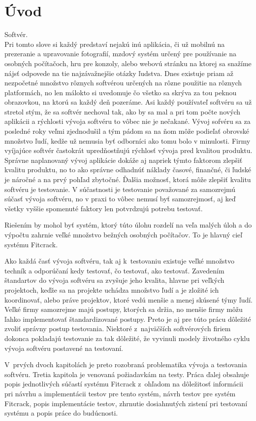 \chapter{Úvod}
Softvér. \\
Pri tomto slove si každý predstaví nejakú inú aplikácia, či už mobilnú na prezeranie a upravovanie fotografií, mzdový systém určený pre používanie na osobných počítačoch, hru pre konzoly, alebo webovú stránku na ktorej sa snažíme nájsť odpovede na tie najzávažnejšie otázky ľudstva.
Dnes existuje priam až nezpočetné množstvo rôznych softvérou určených na rôzne použitie na rôznych platformách, no len málokto si uvedomuje čo všetko sa skrýva za tou peknou obrazovkou, na ktorú sa každý deň pozeráme.
Asi každý používateľ softvéru sa už stretol stým, že sa softvér nechoval tak, ako by sa mal a pri tom počte nových aplikácii a rýchlosti vývoja softvéru to vôbec nie je nečakané. 
Vývoj sofvéru sa za posledné roky veľmi zjednodušil a tým pádom sa na ňom môže podieľať obrovské množstvo ľudí, kedže už nemusia byť odborníci ako tomu bolo v minulosti.
Firmy vyíjajúce softvér častokrát upredňostňujú rýchlosť vývoja pred kvalitou produktu.
Správne naplanovaný vývoj aplikácie dokáže aj napriek týmto faktorom zlepšiť kvalitu produktu, no to ako správne odhadnúť náklady časové, finančné, či ľudské je náročné a na prvý pohľad zbytočné.
Ďalšia možnosť, ktorá môže zlepšiť kvalitu softvéru je testovanie.
V súčastnosti je testovanie považované za samozrejmú súčasť vývoja softvéru, no v praxi to vôbec nemusí byť samozrejmosť, aj keď všetky vyššie spomenuté faktory len potvrdzujú potrebu testovať.

Riešením by mohol byť systém, ktorý túto úlohu rozdelí na veľa malých úloh a do výpočtu zahrnie veľké množstvo bežných osobných počítačov.
To je hlavný cieľ systému Fitcrack.

Ako každá časť vývoja softvéru, tak aj k~testovaniu existuje veľké množstvo techník a odporúčaní kedy testovať, čo testovať, ako testovať.
Zavedením štandartov do vývoja softvéru sa zvyšuje jeho kvalita, hlavne pri veľkých projektoch, keďže sa na projekte uchádza množstvo ľudí a je zložité ich koordinovať, alebo práve projektov, ktoré vedú menšie a menej skúsené týmy ľudí.
Veľké firmy samozrejme majú postupy, ktorých sa držia, no menšie firmy môžu ľahko implementovať štandardizované postupy.
Preto je aj pre túto prácu dôležité zvoliť správny postup testovania.
Niektoré z~najväčších softvérových firiem dokonca pokladajú testovanie za tak dôležité, že vyvinuli modely životného cyklu vývoja softvéru postavené na testovaní.

V~prvých dvoch kapitolách je preto rozobraná problematika vývoja a testovania softvéru.
Tretia kapitola je venovaná požiadavkám na testy.
Práca ďalej obsahuje popis jednotlivých súčastí systému Fitcrack z~ohľadom na dôležitosť informácii pri návrhu a implementácii testov pre tento systém, návrh testov pre systém Fitcrack, popis implementácie testov, zhrnutie dosiahnutých zistení pri testovaní systému a popis práce do budúcnosti.

